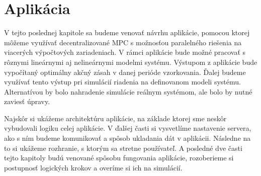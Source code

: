 \chapter{Aplikácia}
\label{part:Aplikacia}

V tejto poslednej kapitole sa budeme venovať návrhu aplikácie, pomocou ktorej môžeme využívať decentralizované MPC s možnosťou paralelného riešenia na viacerých výpočtových zariadeniach. V rámci aplikácie bude možné pracovať s rôznymi lineárnymi aj nelineárnymi modelmi systému. Výstupom z aplikácie bude vypočítaný optimálny akčný zásah v danej perióde vzorkovania. Ďalej budeme využívať tento výstup pri simulácií riadenia na definovanom modeli systému. Alternatívou by bolo nahradenie simulácie reálnym systémom, ale bolo by nutné zaviesť úpravy. 

Najskôr si ukážeme architektúru aplikácie, na základe ktorej sme neskôr vybudovali logiku celej aplikácie. V ďalšej časti si vysvetlíme nastavenie servera, ako s ním budeme komunikovať a spôsob ukladania dát v aplikácii. Následne na to si ukážeme rozhranie, s ktorým sa stretne používateľ. A posledné dve časti tejto kapitoly budú venované spôsobu fungovania aplikácie, rozoberieme si postupnosť logických krokov a overíme si ich na simulácií. 
